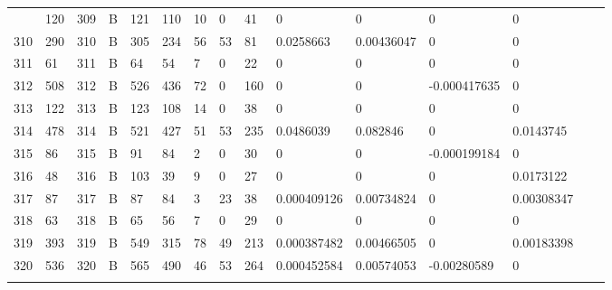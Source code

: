 \begin{longtable}{lllllllllllllll}
\begin{comment}
	309 & 120               & 309 & B   & 121               & 110               & 10                & 0    & 41         & 0              & 0              & 0             & 0            \\
	310 & 290               & 310 & B   & 305               & 234               & 56                & 53   & 81         & 0.0258663      & 0.00436047     & 0             & 0            \\
	311 & 61                & 311 & B   & 64                & 54                & 7                 & 0    & 22         & 0              & 0              & 0             & 0            \\
	312 & 508               & 312 & B   & 526               & 436               & 72                & 0    & 160        & 0              & 0              & -0.000417635  & 0            \\
	313 & 122               & 313 & B   & 123               & 108               & 14                & 0    & 38         & 0              & 0              & 0             & 0            \\
	314 & 478               & 314 & B   & 521               & 427               & 51                & 53   & 235        & 0.0486039      & 0.082846       & 0             & 0.0143745    \\
	315 & 86                & 315 & B   & 91                & 84                & 2                 & 0    & 30         & 0              & 0              & -0.000199184  & 0            \\
	316 & 48                & 316 & B   & 103               & 39                & 9                 & 0    & 27         & 0              & 0              & 0             & 0.0173122    \\
	317 & 87                & 317 & B   & 87                & 84                & 3                 & 23   & 38         & 0.000409126    & 0.00734824     & 0             & 0.00308347   \\
	318 & 63                & 318 & B   & 65                & 56                & 7                 & 0    & 29         & 0              & 0              & 0             & 0            \\
	319 & 393               & 319 & B   & 549               & 315               & 78                & 49   & 213        & 0.000387482    & 0.00466505     & 0             & 0.00183398   \\
	320 & 536               & 320 & B   & 565               & 490               & 46                & 53   & 264        & 0.000452584    & 0.00574053     & -0.00280589   & 0            \\

\end{comment}
\end{longtable}
